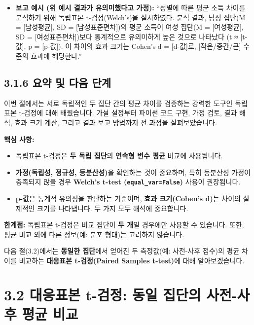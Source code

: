 \documentclass[
  letterpaper,
]{book}
\providecommand{\tightlist}{%
  \setlength{\itemsep}{0pt}\setlength{\parskip}{0pt}}
\begin{document}
\begin{itemize}
\tightlist
\item
  \textbf{보고 예시 (위 예시 결과가 유의미했다고 가정):} ``성별에 따른
  평균 소득 차이를 분석하기 위해 독립표본 t-검정(Welch's)을 실시하였다.
  분석 결과, 남성 집단(M = {[}남성평균{]}, SD = {[}남성표준편차{]})의
  평균 소득이 여성 집단(M = {[}여성평균{]}, SD = {[}여성표준편차{]})보다
  통계적으로 유의미하게 높은 것으로 나타났다 (t ≈ {[}t-값{]}, p =
  {[}p-값{]}). 이 차이의 효과 크기는 Cohen's d = {[}d-값{]}로,
  {[}작은/중간/큰{]} 수준의 효과에 해당한다.''
\end{itemize}

\subsection{3.1.6 요약 및 다음
단계}\label{uxc694uxc57d-uxbc0f-uxb2e4uxc74c-uxb2e8uxacc4}

이번 절에서는 서로 독립적인 두 집단 간의 평균 차이를 검증하는 강력한
도구인 독립표본 t-검정에 대해 배웠습니다. 가설 설정부터 파이썬 코드
구현, 가정 검토, 결과 해석, 효과 크기 계산, 그리고 결과 보고 방법까지 전
과정을 살펴보았습니다.

\textbf{핵심 사항:}

\begin{itemize}
\tightlist
\item
  독립표본 t-검정은 \textbf{두 독립 집단}의 \textbf{연속형 변수 평균}
  비교에 사용됩니다.
\item
  \textbf{가정(독립성, 정규성, 등분산성)}을 확인하는 것이 중요하며, 특히
  등분산성 가정이 충족되지 않을 경우 \textbf{Welch's t-test
  (\texttt{equal\_var=False})} 사용이 권장됩니다.
\item
  \textbf{p-값}은 통계적 유의성을 판단하는 기준이며, \textbf{효과
  크기(Cohen's d)}는 차이의 실제적인 크기를 나타냅니다. 두 가지 모두
  해석에 중요합니다.
\end{itemize}

\textbf{한계점:} 독립표본 t-검정은 비교 집단이 \textbf{두 개}일 경우에만
사용할 수 있습니다. 또한, 평균 비교 외에 다른 정보(예: 분포 형태)는
고려하지 않습니다.

다음 절(3.2)에서는 \textbf{동일한 집단}에서 얻어진 두 측정값(예:
사전-사후 점수)의 평균 차이를 비교하는 \textbf{대응표본 t-검정(Paired
Samples t-test)}에 대해 알아보겠습니다.

\section{3.2 대응표본 t-검정: 동일 집단의 사전-사후 평균
비교}\label{sec-paired-t-test}
\end{document}
